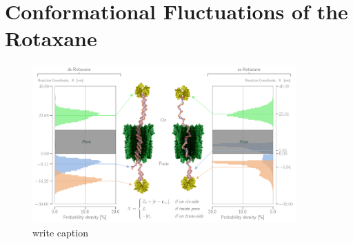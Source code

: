 \section{Conformational Fluctuations of the Rotaxane}

%
%
%

%


\begin{figure}
\begin{center}
  \includegraphics[width=0.90\textwidth]{Figures/RotaxaneFluctuations.png}
  \caption{write caption}
\end{center}
\end{figure}
